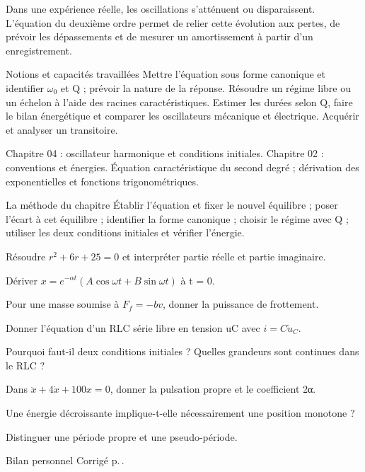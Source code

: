 Dans une expérience réelle, les oscillations s’atténuent ou disparaissent. L’équation du deuxième ordre permet de relier cette évolution aux pertes, de prévoir les dépassements et de mesurer un amortissement à partir d’un enregistrement.
\begin{loi}{Notions et capacités travaillées}
Mettre l’équation sous forme canonique et identifier $\omega_0$ et Q ; prévoir la nature de la réponse. Résoudre un régime libre ou un échelon à l’aide des racines caractéristiques. Estimer les durées selon Q, faire le bilan énergétique et comparer les oscillateurs mécanique et électrique. Acquérir et analyser un transitoire.
\end{loi}

Chapitre 04 : oscillateur harmonique et conditions initiales. Chapitre 02 : conventions et énergies. Équation caractéristique du second degré ; dérivation des exponentielles et fonctions trigonométriques.

\begin{methode}{La méthode du chapitre}
Établir l’équation et fixer le nouvel équilibre ; poser l’écart à cet équilibre ; identifier la forme canonique ; choisir le régime avec Q ; utiliser les deux conditions initiales et vérifier l’énergie.
\end{methode}


\begin{questions}
\item Résoudre $r^2+6r+25=0$ et interpréter partie réelle et partie imaginaire.
\item Dériver $x=e^{-\alpha t}(A\cos\omega t+B\sin\omega t)$ à t = 0.
\item Pour une masse soumise à $F_f=-bv$, donner la puissance de frottement.
\item Donner l’équation d’un RLC série libre en tension uC avec $i=C\dot u_C$.
\item Pourquoi faut-il deux conditions initiales ? Quelles grandeurs sont continues dans le RLC ?
\item Dans $\ddot x+4\dot x+100x=0$, donner la pulsation propre et le coefficient 2α.
\item Une énergie décroissante implique-t-elle nécessairement une position monotone ?
\item Distinguer une période propre et une pseudo-période.
\end{questions}
\begin{docu}{Bilan personnel}
Corrigé p.\,\pageref{ch05-corr-diag}.
\end{docu}


